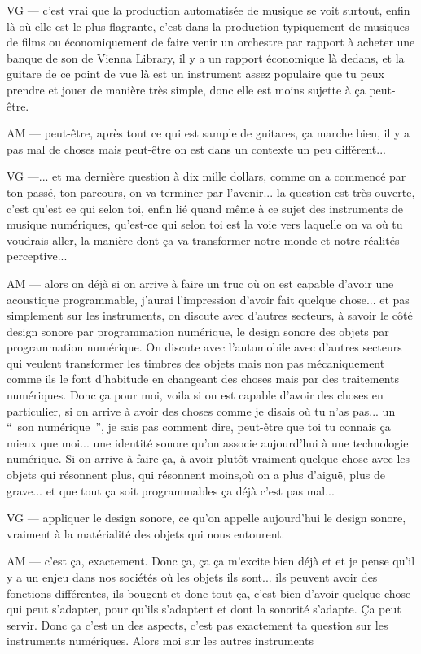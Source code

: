 VG — c'est vrai que la production automatisée de musique se voit surtout, enfin là où elle est le plus flagrante, c'est dans la production typiquement de musiques de films ou économiquement de faire venir un orchestre par rapport à acheter une banque de son de Vienna Library, il y a un rapport économique là dedans, et la guitare de ce point de vue là est un instrument assez populaire que tu peux prendre et jouer de manière très simple, donc elle est moins sujette à ça peut-être.

AM — peut-être, après tout ce qui est sample de guitares, ça marche bien, il y a pas mal de choses mais peut-être on est dans un contexte un peu différent... 

VG —... et ma dernière question à dix mille dollars, comme on a commencé par ton passé, ton parcours, on va terminer par l'avenir... la question est très ouverte, c'est qu'est ce qui selon toi, enfin lié quand même à ce sujet des instruments de musique numériques, qu'est-ce qui selon toi est la voie vers laquelle on va où tu voudrais aller, la manière dont ça va transformer notre monde et notre réalités perceptive... 

AM — alors on déjà si on arrive à faire un truc où on est capable d'avoir une acoustique programmable, j'aurai l'impression d'avoir fait quelque chose... et pas simplement sur les instruments, on discute avec d'autres secteurs, à savoir le côté design sonore par programmation numérique, le design sonore des objets par programmation numérique. On discute avec l'automobile avec d'autres secteurs qui veulent transformer les timbres des objets mais non pas mécaniquement comme ils le font d'habitude en changeant des choses mais par des traitements numériques. Donc ça pour moi, voila si on est capable d'avoir des choses en particulier, si on arrive à avoir des choses comme je disais où tu n'as pas... un “ son numérique ”, je sais pas comment dire, peut-être que toi tu connais ça mieux que moi... une identité sonore qu'on associe aujourd'hui à une technologie numérique. Si on arrive à faire ça, à avoir plutôt vraiment quelque chose avec les objets qui résonnent plus, qui résonnent moins,où on a plus d'aiguë, plus de grave... et que tout ça soit programmables ça déjà c'est pas mal... 

VG — appliquer le design sonore, ce qu'on appelle aujourd'hui le design sonore, vraiment à la matérialité des objets qui nous entourent.

AM — c'est ça, exactement. Donc ça, ça ça m'excite bien déjà et et je pense qu'il y a un enjeu dans nos sociétés où les objets ils sont... ils peuvent avoir des fonctions différentes, ils bougent et donc tout ça, c'est bien d'avoir quelque chose qui peut s'adapter, pour qu'ils s'adaptent et dont la sonorité s'adapte. Ça peut servir. Donc ça c'est un des aspects, c'est pas exactement ta question sur les instruments numériques. Alors moi sur les autres instruments 


